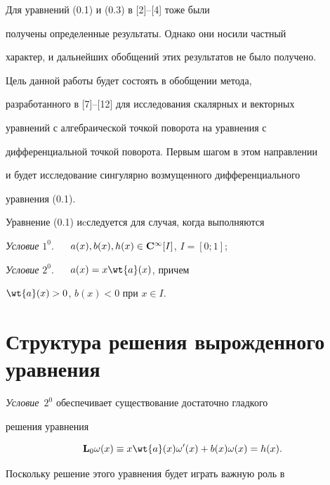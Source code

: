 Для уравнений (0.1) и (0.3) в [2]--[4] тоже были


получены определенные результаты. Однако они носили частный


характер, и дальнейших обобщений этих результатов не было получено.





Цель данной работы будет состоять в обобщении метода,


разработанного в [7]--[12] для исследования скалярных и векторных


уравнений с алгебраической точкой поворота на уравнения с


дифференциальной точкой поворота. Первым шагом в этом направлении


и будет исследование сингулярно возмущенного дифференциального


уравнения (0.1).





Уравнение (0.1) иcследуется для случая, когда выполняются





{\it Условие} $1^0$. $\quad$ $a(x), b(x), h(x) \in


\bold{C}^{\infty} [I]$, $I=[0; 1]$;





{\it Условие} $2^0$. $\quad$ $a(x) = x \wt{a} (x)$, причем


$\wt{a} (x) >0$, $b(x) < 0$ при $x \in I$.





\section{Структура решения вырожденного уравнения}





{\it Условие}~$2^0$ обеспечивает существование достаточно гладкого


решения уравнения 


\begin{equation}


\bold{L}_0 \o (x) \equiv x \wt{a} (x) \o' (x) + b(x) \o (x) =h(x).


\end{equation}


Поскольку решение этого уравнения будет играть важную роль в


